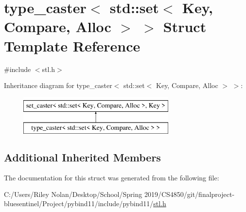 \hypertarget{structtype__caster_3_01std_1_1set_3_01_key_00_01_compare_00_01_alloc_01_4_01_4}{}\section{type\+\_\+caster$<$ std\+::set$<$ Key, Compare, Alloc $>$ $>$ Struct Template Reference}
\label{structtype__caster_3_01std_1_1set_3_01_key_00_01_compare_00_01_alloc_01_4_01_4}


{\ttfamily \#include $<$stl.\+h$>$}

Inheritance diagram for type\+\_\+caster$<$ std\+::set$<$ Key, Compare, Alloc $>$ $>$\+:\begin{figure}[H]
\begin{center}
\leavevmode
\includegraphics[height=2.000000cm]{structtype__caster_3_01std_1_1set_3_01_key_00_01_compare_00_01_alloc_01_4_01_4}
\end{center}
\end{figure}
\subsection*{Additional Inherited Members}


The documentation for this struct was generated from the following file\+:\begin{DoxyCompactItemize}
\item 
C\+:/\+Users/\+Riley Nolan/\+Desktop/\+School/\+Spring 2019/\+C\+S4850/git/finalproject-\/bluesentinel/\+Project/pybind11/include/pybind11/\mbox{\hyperlink{stl_8h}{stl.\+h}}\end{DoxyCompactItemize}
